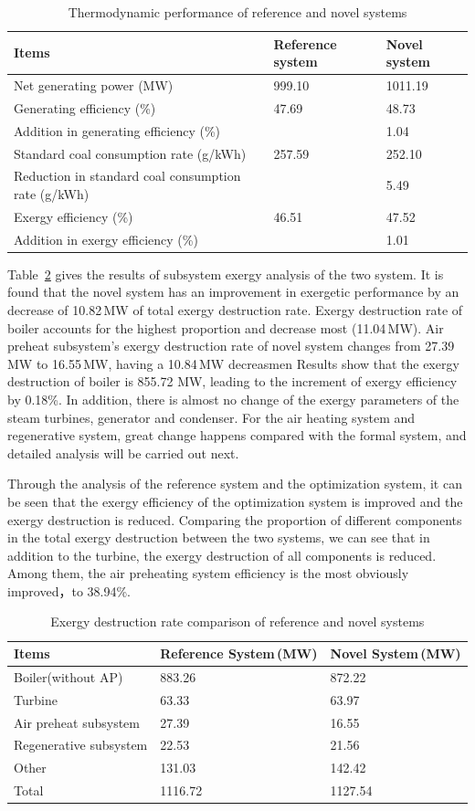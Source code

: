 \documentclass[preprint,12pt]{elsarticle}
\begin{document}
\begin{table}
\caption{Thermodynamic performance of reference and novel systems}
\label{table:thermal performance compare}
\centering
\begin{tabular}{p{7.5cm}p{1.75cm}p{1.75cm}}
\toprule 
Items & Reference system & Novel system\tabularnewline
\midrule
Net generating power (MW) & 999.10 & 1011.19\tabularnewline
Generating efficiency (\%) & 47.69 & 48.73\tabularnewline
Addition in generating efficiency (\%) &  & 1.04\tabularnewline
Standard coal consumption rate (g/kWh) & 257.59 & 252.10\tabularnewline
Reduction in standard coal consumption rate (g/kWh) &  & 5.49\tabularnewline
Exergy efficiency (\%) & 46.51 & 47.52\tabularnewline
Addition in exergy efficiency (\%) &  & 1.01\tabularnewline
\bottomrule
\end{tabular}
\end{table}
Table~\ref{table:system exergy campare} gives the results of subsystem exergy analysis of the two system. 
It is found that the novel system has an improvement in exergetic performance by an decrease of 10.82\,MW of total exergy destruction rate.
Exergy destruction rate of boiler accounts for the highest proportion and decrease most (11.04\,MW).
Air preheat subsystem's exergy destruction rate of novel system changes from 27.39\,MW to 16.55\,MW, having a 10.84\,MW decreasmen
 Results show that the exergy destruction of boiler is 855.72 MW, leading to the increment of exergy efficiency by 0.18\%. In addition, there is almost no change of the exergy parameters of the steam turbines, generator and condenser. 
 For the air heating system and regenerative system, great change happens compared with the formal system, and detailed analysis will be carried out next.

Through the analysis of the reference system and the optimization system, it can be seen that the exergy efficiency of the optimization system is improved and the exergy destruction is reduced.
Comparing the proportion of different components in the total exergy destruction between the two systems, we can see that in addition to the turbine, the exergy destruction of all components is reduced. 
Among them, the air preheating system efficiency is the most obviously improved，to 38.94\%.


\begin{table}
\caption{Exergy destruction rate comparison of reference and novel systems }
\label{table:system exergy campare}
\centering
\begin{tabular}{lll}
\toprule 
Items & Reference System\,(MW) & Novel System\,(MW)\tabularnewline
\midrule 
Boiler(without AP) & 883.26 & 872.22\tabularnewline
Turbine & 63.33 & 63.97\tabularnewline
Air preheat subsystem  & 27.39 & 16.55\tabularnewline
Regenerative subsystem & 22.53 & 21.56\tabularnewline
Other & 131.03 & 142.42 \tabularnewline
Total & 1116.72 & 1127.54\tabularnewline
\bottomrule
\end{tabular}
\end{table}
\end{document}
